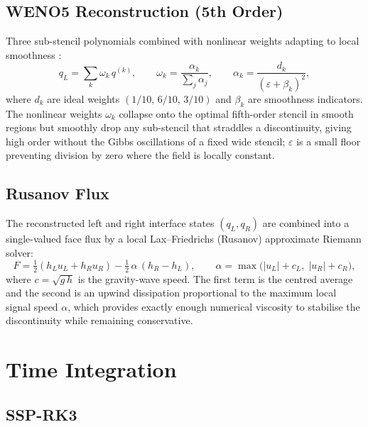 \documentclass[11pt,twoside]{report}
\newcommand{\half}{\tfrac{1}{2}}
\begin{document}
\subsection{WENO5 Reconstruction (5th Order)}

Three sub-stencil polynomials combined with nonlinear weights adapting to
local smoothness \citep{JiangShu1996}:
\begin{equation}
  q_L = \sum_k \omega_k\,q^{(k)}, \qquad
  \omega_k = \frac{\alpha_k}{\sum_j\alpha_j}, \qquad
  \alpha_k = \frac{d_k}{(\varepsilon+\beta_k)^2},
\end{equation}
where $d_k$ are ideal weights $(1/10,\,6/10,\,3/10)$ and $\beta_k$ are
smoothness indicators. The nonlinear weights $\omega_k$ collapse onto the
optimal fifth-order stencil in smooth regions but smoothly drop any sub-stencil
that straddles a discontinuity, giving high order without the Gibbs oscillations
of a fixed wide stencil; $\varepsilon$ is a small floor preventing division by
zero where the field is locally constant.

\subsection{Rusanov Flux}

The reconstructed left and right interface states $(q_L,q_R)$ are combined into a
single-valued face flux by a local Lax--Friedrichs (Rusanov) approximate Riemann
solver:
\begin{equation}
  F = \half(h_L u_L + h_R u_R) - \half\,\alpha\,(h_R-h_L),
  \qquad \alpha=\max\!\bigl(|u_L|+c_L,\;|u_R|+c_R\bigr),
\end{equation}
where $c=\sqrt{g\,h}$ is the gravity-wave speed. The first term is the centred
average and the second is an upwind dissipation proportional to the maximum
local signal speed $\alpha$, which provides exactly enough numerical viscosity
to stabilise the discontinuity while remaining conservative.


\section{Time Integration}
\label{sec:timestepping}

\subsection{SSP-RK3}
\end{document}

